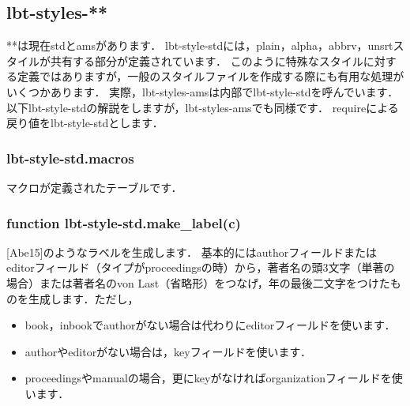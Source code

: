 \documentclass[a4paper]{ltjsarticle}
\begin{document}
\subsection{lbt-styles-**}
**は現在stdとamsがあります．
lbt-style-stdには，plain，alpha，abbrv，unsrtスタイルが共有する部分が定義されています．
このように特殊なスタイルに対する定義ではありますが，一般のスタイルファイルを作成する際にも有用な処理がいくつかあります．
実際，lbt-styles-amsは内部でlbt-style-stdを呼んでいます．
以下lbt-style-stdの解説をしますが，lbt-styles-amsでも同様です．
requireによる戻り値をlbt-style-stdとします．
\subsubsection{lbt-style-std.macros}
マクロが定義されたテーブルです．

\subsubsection{function lbt-style-std.make\_label(c)}
[Abe15]のようなラベルを生成します．
基本的にはauthorフィールドまたはeditorフィールド（タイプがproceedingsの時）から，著者名の頭3文字（単著の場合）または著者名のvon Last（省略形）をつなげ，年の最後二文字をつけたものを生成します．ただし，
\begin{itemize}
\item book，inbookでauthorがない場合は代わりにeditorフィールドを使います．
\item authorやeditorがない場合は，keyフィールドを使います．
\item proceedingsやmanualの場合，更にkeyがなければorganizationフィールドを使います．
\end{itemize}
\end{document}
